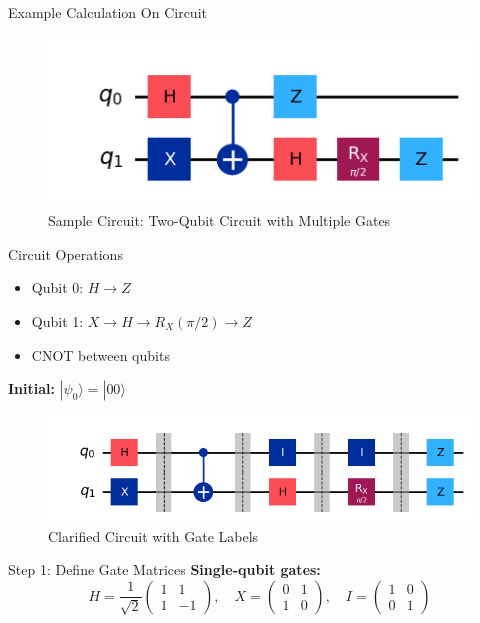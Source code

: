 \documentclass{beamer}
\begin{document}
\begin{frame}{Example Calculation On Circuit}
    \begin{figure}
        \centering
        \includegraphics[width=0.7\linewidth]{Figures/Sample_circuit.png}
        \caption{Sample Circuit: Two-Qubit Circuit with Multiple Gates}
    \end{figure}
    
    \begin{block}{Circuit Operations}
        \begin{itemize}
            \item Qubit 0: $H \rightarrow Z$
            \item Qubit 1: $X \rightarrow H \rightarrow R_X(\pi/2) \rightarrow Z$
            \item CNOT between qubits
        \end{itemize}
        \textbf{Initial:} $|\psi_0\rangle = |00\rangle$
    \end{block}
    
    \framebreak
    \begin{figure}
        \centering
        \includegraphics[width=0.8\linewidth]{Figures/circuit_clarify.png}
        \caption{Clarified Circuit with Gate Labels}
    \end{figure}

    \framebreak
    
    \begin{block}{Step 1: Define Gate Matrices}
        \textbf{Single-qubit gates:}
        \[
        H = \frac{1}{\sqrt{2}} \begin{pmatrix} 1 & 1 \\ 1 & -1 \end{pmatrix}, \quad
        X = \begin{pmatrix} 0 & 1 \\ 1 & 0 \end{pmatrix}, \quad
        I = \begin{pmatrix} 1 & 0 \\ 0 & 1 \end{pmatrix}
        \]
        

\end{block}
\end{frame}
\end{document}
